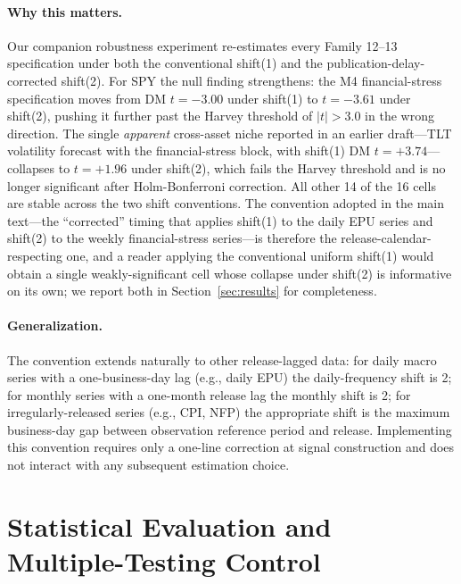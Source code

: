 \documentclass[12pt,a4paper]{article}
\begin{document}
\paragraph{Why this matters.} Our companion robustness experiment re-estimates every Family 12--13 specification under both the conventional shift(1) and the publication-delay-corrected shift(2). For SPY the null finding strengthens: the M4 financial-stress specification moves from DM $t=-3.00$ under shift(1) to $t=-3.61$ under shift(2), pushing it further past the Harvey threshold of $|t|>3.0$ in the wrong direction. The single \emph{apparent} cross-asset niche reported in an earlier draft---TLT volatility forecast with the financial-stress block, with shift(1) DM $t=+3.74$---collapses to $t=+1.96$ under shift(2), which fails the Harvey threshold and is no longer significant after Holm-Bonferroni correction. All other 14 of the 16 cells are stable across the two shift conventions. The convention adopted in the main text---the ``corrected'' timing that applies shift(1) to the daily EPU series and shift(2) to the weekly financial-stress series---is therefore the release-calendar-respecting one, and a reader applying the conventional uniform shift(1) would obtain a single weakly-significant cell whose collapse under shift(2) is informative on its own; we report both in Section~\ref{sec:results} for completeness.

\paragraph{Generalization.} The convention extends naturally to other release-lagged data: for daily macro series with a one-business-day lag (e.g., daily EPU) the daily-frequency shift is 2; for monthly series with a one-month release lag the monthly shift is 2; for irregularly-released series (e.g., CPI, NFP) the appropriate shift is the maximum business-day gap between observation reference period and release. Implementing this convention requires only a one-line correction at signal construction and does not interact with any subsequent estimation choice.


\section{Statistical Evaluation and Multiple-Testing Control}
\label{sec:evaluation}
\end{document}
